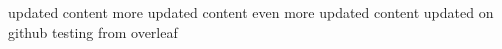 updated content
more updated content
even more updated content
updated on github
testing from overleaf